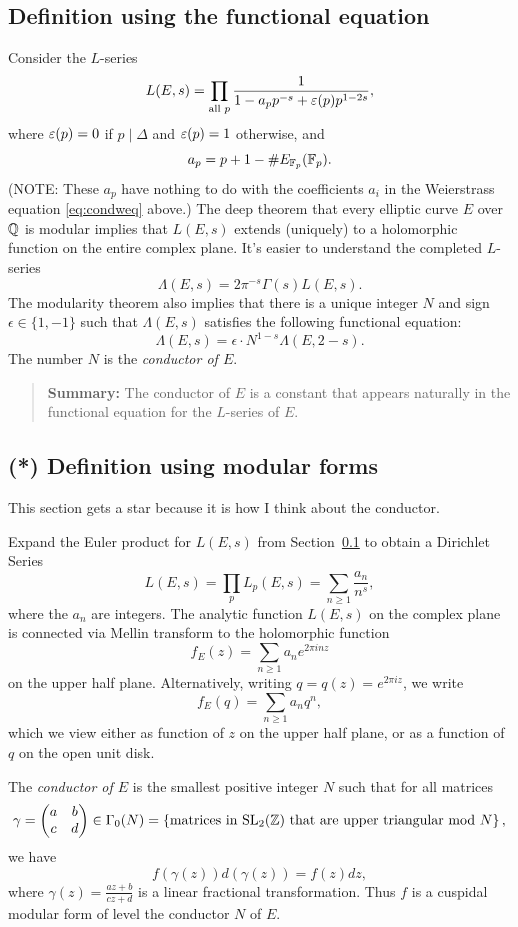 \documentclass{book}
\begin{document}
\subsection{Definition using the functional equation}\label{sec:condfe}
Consider the $L$-series
$$
L(E,s) = \prod_{\text{all }p} \frac{1}{1-a_p p^{-s} + \varepsilon(p)p^{1-2s}},
$$
where $\varepsilon(p)=0$ if $p\mid \Delta$ and $\varepsilon(p)=1$ otherwise, and
$$
 a_p = p + 1 - \# E_{\mathbb{F}_p}(\mathbb{F}_p).
$$
(NOTE: These $a_p$ have nothing to do with the coefficients
$a_i$ in the Weierstrass equation \eqref{eq:condweq} above.)
The deep theorem that every elliptic curve $E$ over $\mathbb{Q}$ is modular
implies that $L(E,s)$ extends (uniquely) to a holomorphic function
on the entire complex plane.  It's easier to understand the completed
$L$-series
$$
\Lambda(E,s) = 2\pi^{-s}\Gamma(s) L(E,s).
$$
The modularity theorem also implies that there is a unique integer
$N$ and sign $\epsilon\in \{1,-1\}$ such that $\Lambda(E,s)$ satisfies the following functional equation:
\begin{equation}\label{eqn:fe}
\Lambda(E,s) = \epsilon \cdot N^{1-s} \Lambda(E,2-s).
\end{equation}
The number $N$ is the {\em conductor of $E$}.



\begin{quote}
{\bf Summary:} The conductor of $E$ is a constant that appears
naturally in the functional equation for the $L$-series of $E$.
\end{quote}

\subsection{(*) Definition using modular forms}\label{sec:condmodform}
This section gets a star because it is how I think about
the conductor.


Expand the Euler product for
$L(E,s)$ from Section~\ref{sec:condfe}
to obtain a Dirichlet Series
$$
L(E,s) = \prod_{p} L_p(E,s) = \sum_{n\geq 1} \frac{a_n}{n^s},
$$
where the $a_n$ are integers.
The analytic function $L(E,s)$ on the complex plane is connected
via Mellin transform to the holomorphic function
$$
f_E(z) = \sum_{n\geq 1} a_n e^{2\pi i n z}
$$
on the upper half plane.  Alternatively, writing $q=q(z) = e^{2\pi i z}$,
we write
$$
f_E(q) = \sum_{n\geq 1} a_n q^n,
$$
which we view either as function of $z$ on the upper half plane,
or as a function of $q$ on the open unit disk.

The {\em conductor of $E$} is the smallest positive integer $N$
such that for all  matrices
$$
\gamma = \left( \begin{matrix}a&b\\c&d \end{matrix}\right) \in \Gamma_0(N)
  = \left\{\text{matrices in $\operatorname{SL}_2(\mathbb{Z})$ that are upper triangular mod $N$}\right\},
$$
we have
$$f(\gamma(z))d(\gamma(z)) = f(z)dz,$$
where $\gamma(z) = \frac{az+b}{cz+d}$ is a linear fractional transformation.
Thus $f$ is a cuspidal modular form of level the conductor
$N$ of $E$.
\end{document}
